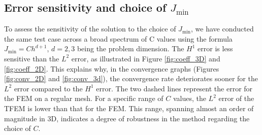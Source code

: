 \documentclass{article}
\theoremstyle{remark}
\newcommand{\Jmin}{J_{\text{min}}}
\begin{document}
\subsection{Error sensitivity and  choice of \texorpdfstring{$\Jmin$}{}} \label{sensitivity}
To assess the sensitivity of the solution to the choice of $\Jmin$, we have conducted the same test case across a broad spectrum of C values using the formula $\Jmin = Ch^{d+1}$, $d=2,3$ being the problem dimension.
The $H^1$ error is less sensitive than the $L^2$ error, as illustrated in Figure \ref{fig:coeff_3D} and \ref{fig:coeff_2D}. This explains why, in the convergence graphs (Figures \ref{fig:conv_2D} and \ref{fig:conv_3d}), the convergence rate deteriorates sooner for the $L^2$ error compared to the $H^1$ error. The two dashed lines represent the error for the FEM on a regular mesh. For a specific range of $C$ values, the $L^2$ error of the TFEM is lower than that for the FEM. This range, spanning almost an order of magnitude in 3D, indicates a degree of robustness in the method regarding the choice of $C$.
\end{document}
